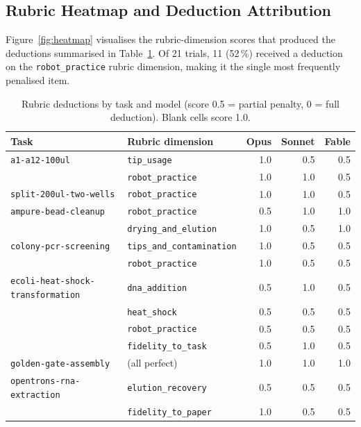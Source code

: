 \documentclass[11pt,a4paper]{article}
\begin{document}
\subsection{Rubric Heatmap and Deduction Attribution}
\label{sec:heatmap}

Figure~\ref{fig:heatmap} visualises the rubric-dimension scores that
produced the deductions summarised in Table~\ref{tab:deductions}.
Of 21 trials, 11 (52\,\%) received a deduction on the
\texttt{robot\_practice} rubric dimension, making it the single most
frequently penalised item.

\begin{table}[H]
\centering
\caption{Rubric deductions by task and model (score 0.5 = partial penalty,
0 = full deduction). Blank cells score 1.0.}
\label{tab:deductions}
\footnotesize
\begin{tabular}{lp{3.4cm}rrr}
\toprule
\textbf{Task} & \textbf{Rubric dimension} & \textbf{Opus} & \textbf{Sonnet} & \textbf{Fable} \\
\midrule
\texttt{a1-a12-100ul}
  & \texttt{tip\_usage}    &  1.0 & 0.5 & 0.5 \\
  & \texttt{robot\_practice} & 1.0 & 1.0 & 0.5 \\
\texttt{split-200ul-two-wells}
  & \texttt{robot\_practice} & 1.0 & 1.0 & 0.5 \\
\texttt{ampure-bead-cleanup}
  & \texttt{robot\_practice}  & 0.5 & 1.0 & 1.0 \\
  & \texttt{drying\_and\_elution} & 1.0 & 0.5 & 1.0 \\
\texttt{colony-pcr-screening}
  & \texttt{tips\_and\_contamination} & 1.0 & 0.5 & 0.5 \\
  & \texttt{robot\_practice}  & 1.0 & 0.5 & 0.5 \\
\texttt{ecoli-heat-shock-transformation}
  & \texttt{dna\_addition}   & 0.5 & 1.0 & 0.5 \\
  & \texttt{heat\_shock}     & 0.5 & 0.5 & 0.5 \\
  & \texttt{robot\_practice} & 0.5 & 0.5 & 0.5 \\
  & \texttt{fidelity\_to\_task} & 0.5 & 1.0 & 0.5 \\
\texttt{golden-gate-assembly}
  & (all perfect)           & 1.0 & 1.0 & 1.0 \\
\texttt{opentrons-rna-extraction}
  & \texttt{elution\_recovery}  & 0.5 & 0.5 & 0.5 \\
  & \texttt{fidelity\_to\_paper} & 1.0 & 0.5 & 0.5 \\
\bottomrule
\end{tabular}
\end{table}
\end{document}
